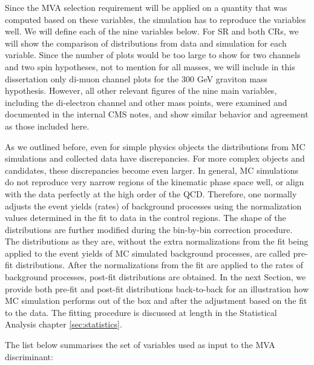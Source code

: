 Since the MVA selection requirement will be applied on a quantity that was computed based on these variables, the simulation has to reproduce the variables well. We will define each of the nine variables below. For SR and both CRs, we will show the comparison of distributions from data and simulation for each variable. Since the number of plots would be too large to show for two channels and two spin hypotheses, not to mention for all masses, we will include in this dissertation only di-muon channel plots for the 300 GeV graviton mass hypothesis. However, all other relevant figures of the nine main variables, including the di-electron channel and other mass points, were examined and documented in the internal CMS notes, and show similar behavior and agreement as those included here.

As we outlined before, even for simple physics objects the distributions from MC simulations and collected data have discrepancies. For more complex objects and candidates, these discrepancies become even larger. In general, MC simulations do not reproduce very narrow regions of the kinematic phase space well, or align with the data perfectly at the high order of the QCD. Therefore, one normally adjusts the event yields (rates) of background processes using the normalization values determined in the fit to data in the control regions. The shape of the distributions are further modified during the bin-by-bin correction procedure. The distributions as they are, without the extra normalizations from the fit being applied to the event yields of MC simulated background processes, are called pre-fit distributions. After the normalizations from the fit are applied to the rates of background processes, post-fit distributions are obtained. In the next Section, we provide both pre-fit and post-fit distributions back-to-back for an illustration how MC simulation performs out of the box and after the adjustment based on the fit to the data. The fitting procedure is discussed at length in the Statistical Analysis chapter \ref{sec:statistics}. 

The list below summarises the set of variables used as input to the MVA discriminant:


